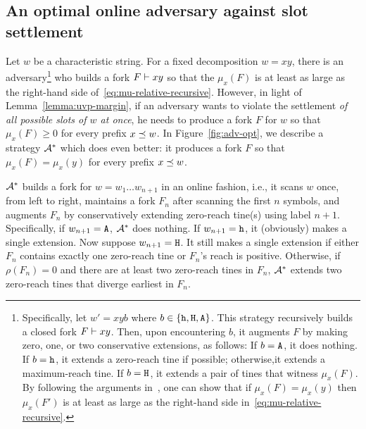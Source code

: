








\subsection{An optimal online adversary against slot settlement}
\label{sec:opt-adversary}
Let $w$ be a characteristic string. 
For a fixed decomposition $w = xy$, 
there is an adversary\footnote{
  Specifically, 
  let $w' = xyb$ 
  where $b \in \{\mathtt{h}, \mathtt{H}, \mathtt{A}\}$. 
  This strategy recursively builds a closed fork $F \vdash xy$. 
  Then, upon encountering $b$, 
  it augments $F$ 
  by making zero, one, or two conservative extensions, as follows: 
  If $b = \mathtt{A}$, it does nothing. 
  If $b = \mathtt{h}$, it extends a zero-reach tine if possible; 
  otherwise,it extends a maximum-reach tine. 
  If $b = \mathtt{H}$, it extends a pair of tines that 
  witness $\mu_x(F)$. 
  By following the arguments in~\cite{LinearConsistencySODA}, 
  one can show that 
  if $\mu_x(F) = \mu_x(y)$ then 
  $\mu_x(F')$ is 
  at least as large as 
  the right-hand side in~\eqref{eq:mu-relative-recursive}.   
} 
who builds a fork $F \vdash xy$ 
so that the $\mu_x(F)$ is 
at least as large as 
the right-hand side of~\eqref{eq:mu-relative-recursive}. 
However, 
in light of Lemma~\ref{lemma:uvp-margin}, 
if an adversary wants to violate the settlement 
\emph{of all possible slots of $w$ at once}, 
he needs to produce a fork $F$ for $w$ 
so that $\mu_x(F) \geq 0$ 
for every prefix $x \preceq w$. 
In Figure~\ref{fig:adv-opt}, 
we describe a strategy $\mathcal{A}^*$ 
which does even better: 
it produces a fork $F$ so that $\mu_x(F) = \mu_x(y)$ 
for every prefix $x \preceq w$. 


$\mathcal{A}^*$ builds a fork for $w = w_1 \ldots w_{n+1}$ 
in an online fashion, i.e., 
it scans $w$ once, from left to right, 
maintains a fork $F_n$ after scanning 
the first $n$ symbols, 
and augments $F_n$ by conservatively extending 
zero-reach tine(s) using label $n + 1$.
Specifically, if $w_{n+1} = \mathtt{A}$, $\mathcal{A}^*$ does nothing. 
If $w_{n+1} = \mathtt{h}$, it (obviously) makes a single extension. 
Now suppose $w_{n+1} = \mathtt{H}$. 
It still makes a single extension
if either $F_n$ contains exactly one zero-reach tine 
or $F_n$'s reach is positive. 
Otherwise, 
if $\rho(F_n) = 0$ 
and there are at least two zero-reach tines in $F_n$, 
$\mathcal{A}^*$ extends two zero-reach tines 
that diverge earliest in $F_n$.



